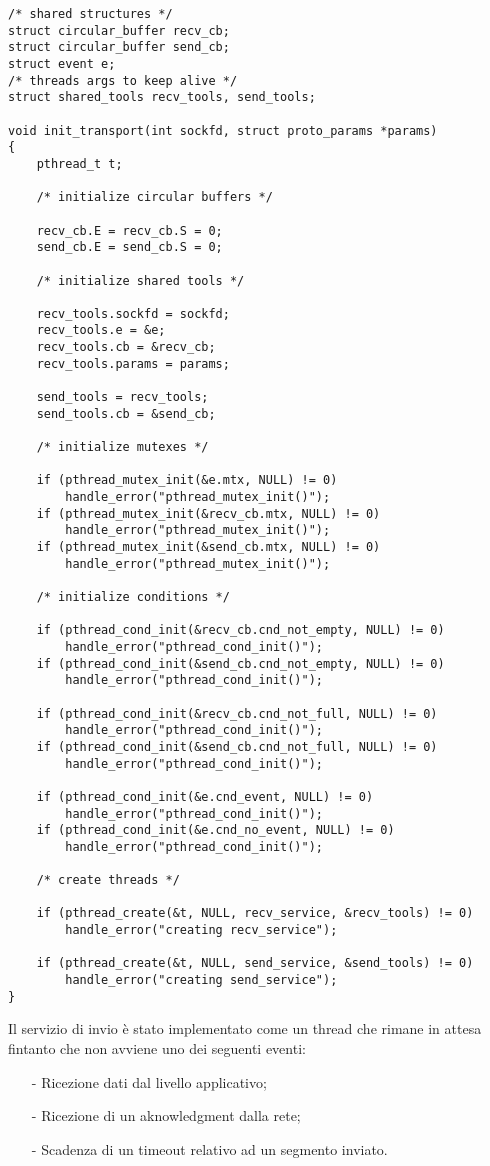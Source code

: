 \begin{lstlisting}[title=transport.c]
/* shared structures */
struct circular_buffer recv_cb;
struct circular_buffer send_cb;
struct event e;
/* threads args to keep alive */
struct shared_tools recv_tools, send_tools;

void init_transport(int sockfd, struct proto_params *params)
{
    pthread_t t;

    /* initialize circular buffers */

    recv_cb.E = recv_cb.S = 0;
    send_cb.E = send_cb.S = 0;

    /* initialize shared tools */

    recv_tools.sockfd = sockfd;
    recv_tools.e = &e;
    recv_tools.cb = &recv_cb;
    recv_tools.params = params;

    send_tools = recv_tools;
    send_tools.cb = &send_cb;

    /* initialize mutexes */

    if (pthread_mutex_init(&e.mtx, NULL) != 0)
        handle_error("pthread_mutex_init()");
    if (pthread_mutex_init(&recv_cb.mtx, NULL) != 0)
        handle_error("pthread_mutex_init()");
    if (pthread_mutex_init(&send_cb.mtx, NULL) != 0)
        handle_error("pthread_mutex_init()");

    /* initialize conditions */

    if (pthread_cond_init(&recv_cb.cnd_not_empty, NULL) != 0)
        handle_error("pthread_cond_init()");
    if (pthread_cond_init(&send_cb.cnd_not_empty, NULL) != 0)
        handle_error("pthread_cond_init()");

    if (pthread_cond_init(&recv_cb.cnd_not_full, NULL) != 0)
        handle_error("pthread_cond_init()");
    if (pthread_cond_init(&send_cb.cnd_not_full, NULL) != 0)
        handle_error("pthread_cond_init()");

    if (pthread_cond_init(&e.cnd_event, NULL) != 0)
        handle_error("pthread_cond_init()");
    if (pthread_cond_init(&e.cnd_no_event, NULL) != 0)
        handle_error("pthread_cond_init()");

    /* create threads */

    if (pthread_create(&t, NULL, recv_service, &recv_tools) != 0)
        handle_error("creating recv_service");

    if (pthread_create(&t, NULL, send_service, &send_tools) != 0)
        handle_error("creating send_service");
}
\end{lstlisting}
%
Il servizio di invio è stato implementato come un thread che rimane in attesa
fintanto che non avviene uno dei seguenti eventi:
\begin{itemize}
\item[-]Ricezione dati dal livello applicativo;
\item[-]Ricezione di un aknowledgment dalla rete;
\item[-]Scadenza di un timeout relativo ad un segmento inviato.
\end{itemize}
%


%
